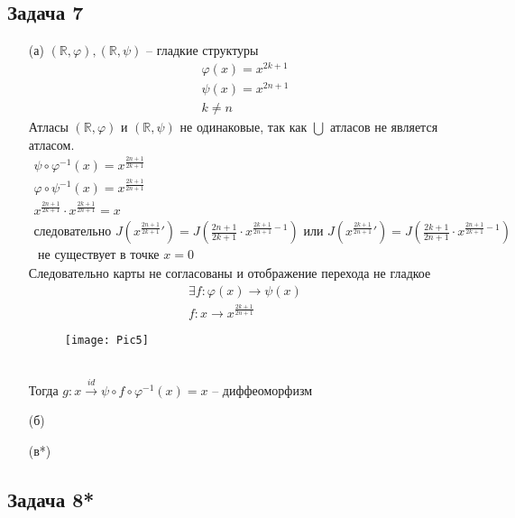 \subsection*{Задача 7}
\begin{enumerate}
	\item[(а)]
		$(\mathbb{R}, \varphi), (\mathbb{R}, \psi)$ -- гладкие структуры\\
		\begin{gather*}
			\varphi(x) = x^{2k+1}\\
			\psi(x) = x^{2n+1}\\
			k \ne n
		\end{gather*}
		Атласы $(\mathbb{R}, \varphi)$ и $(\mathbb{R}, \psi)$ не одинаковые, так как $\bigcup$ атласов не является атласом.
		\begin{gather*}
			\psi \circ \varphi^{-1}(x) = x^{\frac{2n+1}{2k+1}}\\
			\varphi \circ \psi^{-1}(x) = x^{\frac{2k+1}{2n+1}}\\
			x^{\frac{2n+1}{2k+1}} \cdot x^{\frac{2k+1}{2n+1}} = x\\
			\text{следовательно } J \left(x^{\frac{2n+1}{2k+1}}'\right) = J \left(\frac{2n+1}{2k+1} \cdot x^{\frac{2k+1}{2n+1}-1}\right) \text{ или } J \left(x^{\frac{2k+1}{2n+1}}'\right) = J \left(\frac{2k+1}{2n+1} \cdot x^{\frac{2n+1}{2k+1}-1}\right)\\
			\text{ не существует в точке } x=0
		\end{gather*}
		Следовательно карты не согласованы и отображение перехода не гладкое
		\begin{gather*}
			\exists f: \varphi(x) \to \psi(x)\\
			f: x \to x^{\frac{2k+1}{2n+1}}
		\end{gather*}
		\begin{figure}[!h]
			\texttt{[image: Pic5]}
		\end{figure}\\
		Тогда $g: x \overset{id}{\to} \psi \circ f \circ \varphi^{-1}(x) = x$ -- диффеоморфизм
	\item[(б)]
	\item[(в*)]
\end{enumerate}

\subsection*{Задача 8*}
